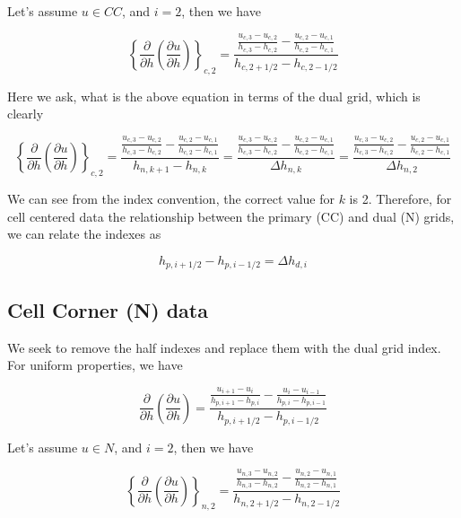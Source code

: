\documentclass[11pt]{article}
\begin{document}
Let's assume $u\in CC$, and $i=2$, then we have

\begin{equation}
 \left\{\frac{\partial}{\partial h} \left( \frac{\partial u}{\partial h} \right) \right\}_{c,2}
 =
 \frac{
 \frac{u_{c,3}-u_{c,2}}{h_{c,3}-h_{c,2}} -
 \frac{u_{c,2}-u_{c,1}}{h_{c,2}-h_{c,1}}
 }{h_{c,2+1/2} - h_{c,2-1/2}}
\end{equation}

Here we ask, what is the above equation in terms of the dual grid, which is clearly

\begin{equation}
 \left\{\frac{\partial}{\partial h} \left( \frac{\partial u}{\partial h} \right) \right\}_{c,2}
 = \frac{ \frac{u_{c,3}-u_{c,2}}{h_{c,3}-h_{c,2}} -  \frac{u_{c,2}-u_{c,1}}{h_{c,2}-h_{c,1}} }{h_{n,k+1} - h_{n,k}}
 =
 \frac{ \frac{u_{c,3}-u_{c,2}}{h_{c,3}-h_{c,2}} -  \frac{u_{c,2}-u_{c,1}}{h_{c,2}-h_{c,1}} }{\Delta h_{n,k}}
 =
 \frac{ \frac{u_{c,3}-u_{c,2}}{h_{c,3}-h_{c,2}} -  \frac{u_{c,2}-u_{c,1}}{h_{c,2}-h_{c,1}} }{\Delta h_{n,2}}
\end{equation}

We can see from the index convention, the correct value for $k$ is 2. Therefore, for cell centered data the relationship between the primary (CC) and dual (N) grids, we can relate the indexes as

\begin{equation}
  h_{p,i+1/2} - h_{p,i-1/2} = \Delta h_{d,i}
\end{equation}

\subsection{Cell Corner (N) data}
We seek to remove the half indexes and replace them with the dual grid index. For uniform properties, we have

\begin{equation}
\frac{\partial}{\partial h} \left( \frac{\partial u}{\partial h} \right)
 =
 \frac{\frac{u_{i+1}-u_{i}}{h_{p,i+1}-h_{p,i}} - \frac{u_{i}-u_{i-1}}{h_{p,i}-h_{p,i-1}}}{h_{p,i+1/2} - h_{p,i-1/2}}
\end{equation}

Let's assume $u\in N$, and $i=2$, then we have

\begin{equation}
 \left\{\frac{\partial}{\partial h} \left( \frac{\partial u}{\partial h} \right) \right\}_{n,2}
 =
 \frac{
 \frac{u_{n,3}-u_{n,2}}{h_{n,3}-h_{n,2}} -
 \frac{u_{n,2}-u_{n,1}}{h_{n,2}-h_{n,1}}
 }{h_{n,2+1/2} - h_{n,2-1/2}}
\end{equation}
\end{document}
